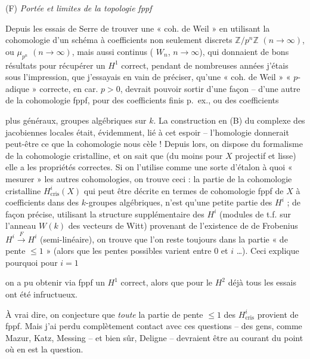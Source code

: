 \documentclass[11pt,a4paper]{article}
\begin{document}
(F) \emph{Portée et limites de la topologie fppf}

Depuis les essais de Serre de trouver une « coh. de Weil » en utilisant la cohomologie d'un schéma à coefficients non seulement discrets $\mathbb{Z}/p^n\mathbb{Z}$ $(n \to \infty)$, ou $\mu_{p^n}$ $(n \to \infty)$, mais aussi continus ( $W_n$, $n \to \infty$), qui donnaient de bons résultats pour récupérer un $H^1$ correct, pendant de nombreuses années j'étais  sous l'impression, que j'essayais en vain de préciser, qu'une « coh. de Weil » « $p$-adique » correcte, en car. $p > 0$, devrait pouvoir sortir d'une façon -- d'une autre de la cohomologie fppf, pour des coefficients finis p.~ex., ou des coefficients

plus généraux, groupes algébriques sur $k$. La construction en (B) du complexe des jacobiennes locales était, évidemment,  lié à cet espoir -- l'homologie donnerait peut-être ce que la cohomologie nous cèle ! Depuis lors, on dispose du formalisme de la cohomologie cristalline, et on sait que  (du moins \struck{\ill{}} pour $X$ projectif et lisse) elle a les propriétés correctes. Si on l'utilise comme une sorte d'étalon  à quoi « mesurer » les autres cohomologies, on trouve ceci : la partie de la cohomologie cristalline $H^i_{\mathrm{cris}}(X)$ qui peut être décrite en termes de cohomologie fppf de $X$ à coefficients dans des $k$-groupes algébriques, n'est qu'une \struck{\ill{}} petite partie des $H^i$ ; de façon précise, utilisant la structure  supplémentaire des $H^i$ (modules de t.f. sur l'anneau $W(k)$ des vecteurs de Witt) provenant de l'existence de  de Frobenius $H^i \xrightarrow{F} H^i$ (semi-linéaire), on trouve que l'on reste toujours dans la partie « de pente $\leqslant 1$ » (alors que les pentes possibles varient entre $0$ et $i$ …). Ceci explique pourquoi pour $i = 1$

on a pu obtenir via fppf un $H^1$ correct, alors que pour le $H^2$ déjà tous les essais ont été infructueux.

À vrai dire, on conjecture que \emph{toute} la partie de pente $\leqslant 1$ des $H^i_{\mathrm{cris}}$ provient de fppf. Mais j'ai perdu complètement contact avec ces questions -- des gens, comme Mazur, Katz, Messing -- et bien sûr, Deligne -- devraient être au courant du point où en est la question.
\end{document}
